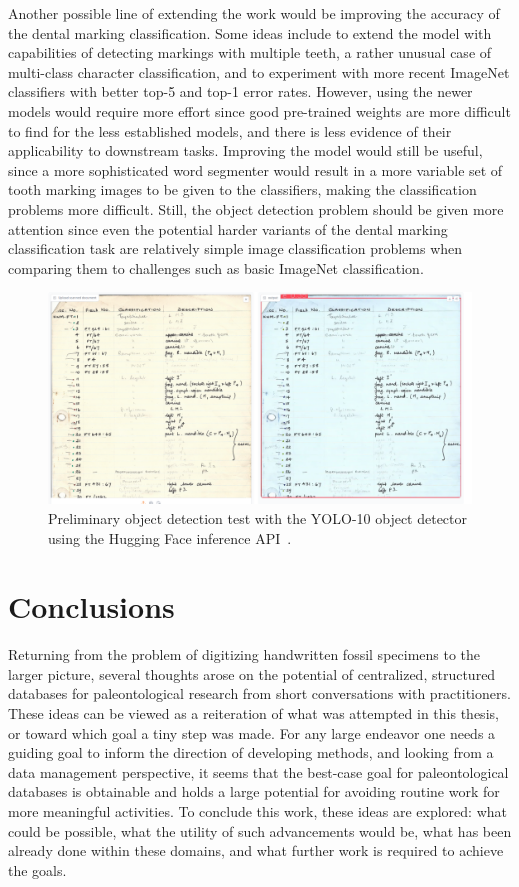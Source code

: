 \documentclass[english,twoside,openright]{UH_DS_MSc}
\begin{document}
Another possible line of extending the work would be improving the accuracy of the dental marking classification. 
Some ideas include to extend the model with capabilities of detecting markings with multiple teeth,
a rather unusual case of multi-class character classification, and to experiment with more recent ImageNet classifiers with better top-5 and top-1 error rates.
However, using the newer models would require more effort since good pre-trained weights are 
more difficult to find for the less established models, and there is less evidence of their applicability to downstream tasks. Improving the model would still be useful, since a more sophisticated word segmenter would result in a more 
variable set of tooth marking images to be given to the classifiers, making the classification problems more difficult. 
Still, the object detection problem should be given more attention since even the 
potential harder variants of the dental marking classification task are relatively simple image classification problems when comparing 
them to challenges such as basic ImageNet classification.

\begin{figure}[ht]
    \centering
    \includegraphics*[scale=0.29]{images/yoloresult.png}
    \caption{Preliminary object detection test with the YOLO-10 object detector using the Hugging Face inference API~\cite{OmouredYOLOv10DocumentLayoutAnalysisHugging2023}.}
    \label{image:yolo}
\end{figure}

\chapter{Conclusions}

Returning from the problem of digitizing handwritten fossil specimens to the larger picture, several thoughts arose on the potential of centralized, structured databases for paleontological research from short conversations with practitioners.
These ideas can be viewed as a reiteration of what was attempted in this thesis, or toward which goal a tiny step was made. For any large endeavor one needs a guiding goal to inform the direction of developing methods, and looking from a data management perspective, it seems that the best-case goal for paleontological databases is obtainable and holds a large potential for avoiding routine work for more meaningful activities. To conclude this work, these ideas are explored: what could be possible, what the utility of such advancements would be, what has been already done within these domains, and what further work is required to achieve the goals.
\end{document}
